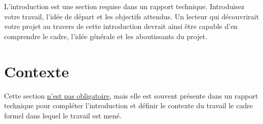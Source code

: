 L'introduction est une section requise dans un rapport technique. Introduisez votre travail, l'idée de départ et les objectifs attendus. Un lecteur qui découvrirait votre projet au travers de cette introduction devrait ainsi être capable d'en comprendre le cadre, l'idée générale et les aboutissants du projet.

\section{Contexte}
Cette section \underline{n'est pas obligatoire}, mais elle est souvent présente dans un rapport technique pour compléter l'introduction et définir le contexte du travail \cad le cadre formel dans lequel le travail est mené. 
